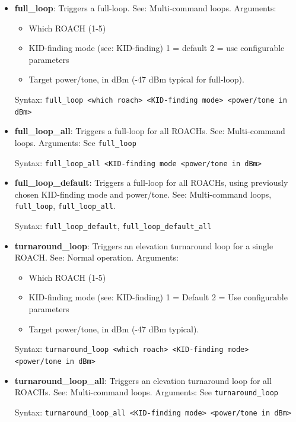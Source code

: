 \begin{itemize}[leftmargin=*,label={}]

\item \textbf{full\_loop}: Triggers a full-loop. See: Multi-command loops.
Arguments:
\begin{itemize}
  \item Which ROACH (1-5)
  \item KID-finding mode (see: KID-finding)
    1 = default
    2 = use configurable parameters
  \item Target power/tone, in dBm (-47 dBm typical for full-loop).
\end{itemize}

Syntax: \texttt{full\_loop <which roach> <KID-finding mode> <power/tone in dBm>}

\item \textbf{full\_loop\_all}: Triggers a full-loop for all ROACHs. See: Multi-command loops.
Arguments: See \texttt{full\_loop}

Syntax: \texttt{full\_loop\_all <KID-finding mode <power/tone in dBm>}

\item \textbf{full\_loop\_default}: Triggers a full-loop for all ROACHs, using previously chosen KID-finding mode and power/tone. See: Multi-command loops, \texttt{full\_loop}, \texttt{full\_loop\_all}.

Syntax: \texttt{full\_loop\_default}, \texttt{full\_loop\_default\_all}

\item \textbf{turnaround\_loop}: Triggers an elevation turnaround loop for a single ROACH. See: Normal operation.
Arguments:
\begin{itemize}
  \item Which ROACH (1-5)
  \item KID-finding mode (see: KID-finding)
    1 = Default
    2 = Use configurable parameters
  \item Target power/tone, in dBm (-47 dBm typical).
\end{itemize}

Syntax: \texttt{turnaround\_loop <which roach> <KID-finding mode> <power/tone in dBm>}

\item \textbf{turnaround\_loop\_all}: Triggers an elevation turnaround loop for all ROACHs. See: Multi-command loops.
Arguments: See \texttt{turnaround\_loop}

Syntax: \texttt{turnaround\_loop\_all <KID-finding mode> <power/tone in dBm>}


\end{itemize}
